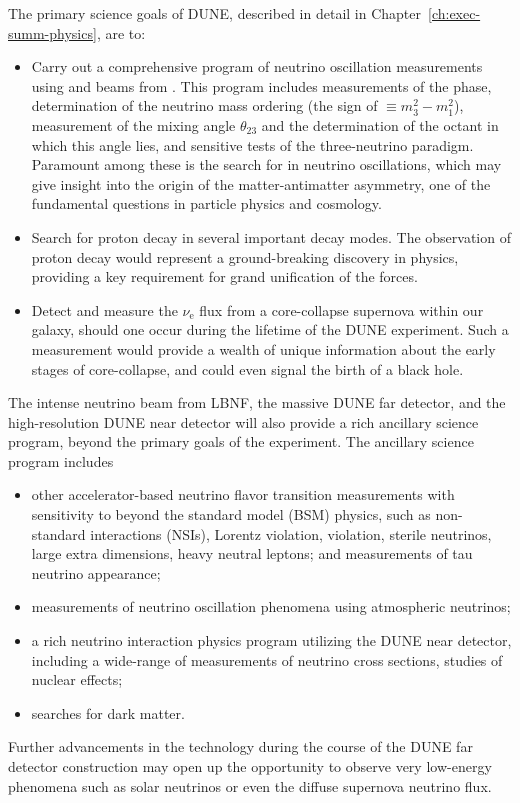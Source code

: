 The primary science goals of DUNE, described in detail in Chapter~\ref{ch:exec-summ-physics}, are to: 
\begin{itemize}

\item Carry out a comprehensive program of neutrino oscillation measurements using \numu and \anumu beams from \fnal. This program includes measurements of the   phase, determination of the neutrino mass ordering (the sign of $ \equiv m_3^2-m_1^2$), measurement of the mixing angle $\theta_{23}$ and the determination of the octant in which this angle lies,
and sensitive tests of the three-neutrino paradigm. Paramount among these is the search for  in neutrino oscillations, which may give insight into the origin of the matter-antimatter asymmetry, one of the fundamental questions in particle physics and cosmology. 

\item Search for proton decay in several important decay modes. The observation of proton decay would represent a ground-breaking discovery in physics, providing a key requirement for grand unification of the forces. 

    \item Detect and measure the $\nu_\text{e}$ flux from a core-collapse supernova within our galaxy, should one occur during the lifetime of the DUNE experiment. Such a measurement would provide a wealth of unique information about the early stages of core-collapse, and could even signal the birth of a black hole.
    
\end{itemize}

The intense neutrino beam from LBNF, the massive DUNE \lartpc far detector, and the high-resolution
DUNE near detector will also provide a rich ancillary science program, beyond the primary goals of the experiment. The ancillary science program includes
\begin{itemize}
     \item other accelerator-based neutrino flavor transition measurements with sensitivity to beyond the standard model (BSM) physics, such as non-standard interactions (NSIs), Lorentz violation,   violation, sterile neutrinos, large extra dimensions, heavy neutral leptons;
 and measurements of tau neutrino appearance;
     \item measurements of neutrino oscillation phenomena using atmospheric neutrinos;
     \item a rich neutrino interaction physics program utilizing the DUNE near detector, including a wide-range of measurements of neutrino cross sections, studies of nuclear effects; %
     \item  searches for dark matter.
\end{itemize} 
Further advancements in the \lartpc %
technology during the course of the DUNE far detector construction may open up the opportunity
to observe very low-energy phenomena such as solar neutrinos or even the diffuse supernova neutrino flux.


